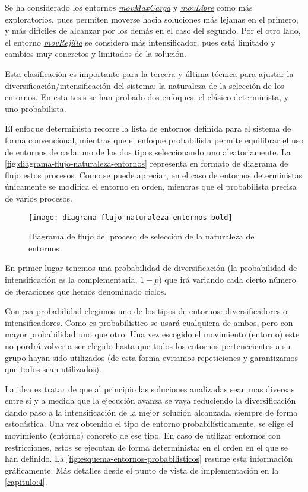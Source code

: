 Se ha considerado los entornos \hyperref[entorno:movMaxCarga]{\textit{movMaxCarga}} y \hyperref[entorno:movLibre]{\textit{movLibre}} como más exploratorios, pues permiten moverse hacia soluciones más lejanas en el primero, y más difíciles de alcanzar por los demás en el caso del segundo. Por el otro lado, el entorno \hyperref[entorno:movRejilla]{\textit{movRejilla}} se considera más intensificador, pues está limitado y cambios muy concretos y limitados de la solución.

Esta clasificación es importante para la tercera y última técnica para ajustar la diversificación/intensificación del sistema: la naturaleza de la selección de los entornos. En esta tesis se han probado dos enfoques, el clásico determinista, y uno probabilista. 

El enfoque determinista recorre la lista de entornos definida para el sistema de forma convencional, mientras que el enfoque probabilista permite equilibrar el uso de entornos de cada uno de los dos tipos seleccionando uno aleatoriamente. La \autoref{fig:diagrama-flujo-naturaleza-entornos} representa en formato de diagrama de flujo estos procesos. Como se puede apreciar, en el caso de entornos deterministas únicamente se modifica el entorno en orden, mientras que el probabilista precisa de varios procesos. 

\begin{figure}
	\centering	\texttt{[image: diagrama-flujo-naturaleza-entornos-bold]}
	\caption{Diagrama de flujo del proceso de selección de la naturaleza de entornos}
	\label{fig:diagrama-flujo-naturaleza-entornos}
\end{figure}

En primer lugar tenemos una probabilidad de diversificación (la probabilidad de intensificación es la complementaria, $1-p$) que irá variando cada cierto número de iteraciones que hemos denominado ciclos. 

Con esa probabilidad elegimos uno de los tipos de entornos: diversificadores o intensificadores. Como es probabilístico se usará cualquiera de ambos, pero con mayor probabilidad uno que otro. Una vez escogido el movimiento (entorno) este no pordrá volver a ser elegido hasta que todos los entornos pertenecientes a su grupo hayan sido utilizados (de esta forma evitamos repeticiones y garantizamos que todos sean utilizados).

La idea es tratar de que al principio las soluciones analizadas sean mas diversas entre sí y a medida que la ejecución avanza se vaya reduciendo la diversificación dando paso a la intensificación de la mejor solución alcanzada, siempre de forma estocástica. Una vez obtenido el tipo de entorno probabilísticamente, se elige el movimiento (entorno) concreto de ese tipo. En caso de utilizar entornos con restricciones, estos se ejecutan de forma determinista: en el orden en el que se han definido. La \autoref{fig:esquema-entornos-probabilisticos} resume esta información gráficamente. Más detalles desde el punto de vista de implementación en la \autoref{capitulo:4}. %

